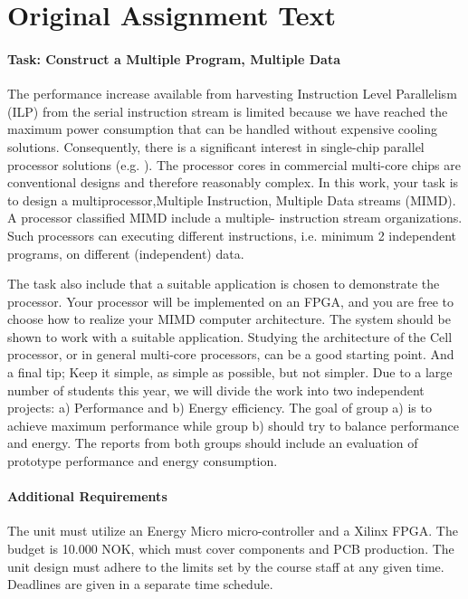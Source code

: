\section{Original Assignment Text}\label{intro:original-text}
\paragraph{Task: Construct a Multiple Program, Multiple Data}
The performance increase available from harvesting Instruction Level Parallelism
(ILP) from the serial instruction stream is limited because we have reached the
maximum power consumption that can be handled without expensive cooling
solutions\cite{olukotun}. Consequently, there is a significant interest in
single-chip parallel processor solutions (e.g. \cite{bell,kongetira}). The
processor cores in commercial multi-core chips are conventional designs and
therefore reasonably complex. In this work, your task is to design a
multiprocessor,Multiple Instruction, Multiple Data streams (MIMD). A processor
classified MIMD include a multiple- instruction stream
organizations\cite{flynn}. Such processors can executing different instructions,
i.e. minimum 2 independent programs, on different (independent) data.

The task also include that a suitable application is chosen to demonstrate the
processor. Your processor will be implemented on an FPGA, and you are free to
choose how to realize your MIMD computer architecture. The system should be
shown to work with a suitable application. Studying the architecture of the
Cell processor\cite{wiki_cell_mpu}, or in general multi-core
processors\cite{wiki_multicore}, can be a good starting point. And a final tip;
Keep it simple, as simple as possible, but not simpler. Due to a large number of
students this year, we will divide the work into two independent projects: a)
Performance and b) Energy efficiency. The goal of group a) is to achieve maximum
performance while group b) should try to balance performance and energy. The
reports from both groups should include an evaluation of prototype performance
and energy consumption.

\paragraph{Additional Requirements}
The unit must utilize an Energy Micro micro-controller and a Xilinx FPGA. The
budget is 10.000 NOK, which must cover components and PCB production. The unit
design must adhere to the limits set by the course staff at any given time.
Deadlines are given in a separate time schedule.

